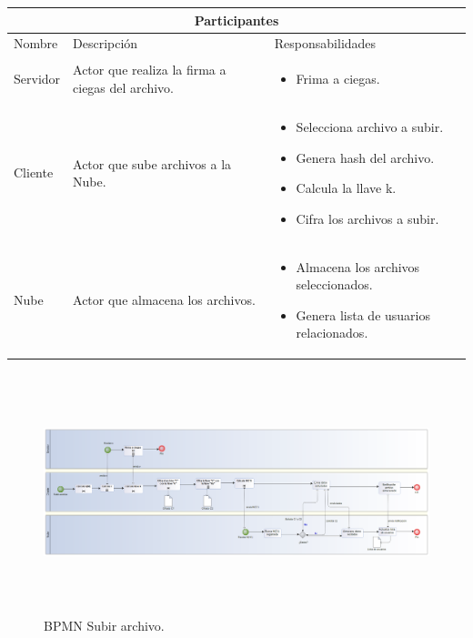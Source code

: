 \begin{tabular}{ |p{2cm}|p{6cm}|p{6cm}|  }
\hline
\multicolumn{3}{|c|}{  Participantes  } \\
\hline

{ Nombre }  & { Descripción } & { Responsabilidades} \\
\hline
{ Servidor } &  Actor que realiza la firma a ciegas del archivo.  &  
			\begin{itemize}	
				\item Frima a ciegas.

			\end{itemize}   \\ 
\hline
{ Cliente } &   Actor que sube archivos a la Nube.  &  
			\begin{itemize}	
				\item Selecciona archivo a subir.
				\item Genera hash del archivo. 
				\item Calcula la llave k.
				\item Cifra los archivos a subir.
			\end{itemize}   \\ 
\hline
{ Nube } &   Actor que almacena los archivos.  &  
			\begin{itemize}	
				\item Almacena los archivos seleccionados.
				\item Genera lista de usuarios relacionados.
			\end{itemize}   \\ 
\hline
\end{tabular}


\begin{figure}[H]
\centering
	\includegraphics[width=16cm, height=7cm]{./images/BPM_Subir.png}
	\caption{BPMN Subir archivo.}

\end{figure}


